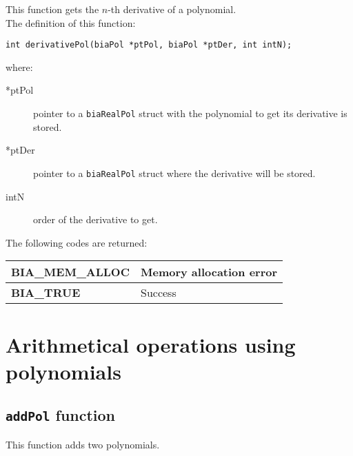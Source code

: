This function gets the $n$-th derivative of a polynomial.\\

The definition of this function:
%
\begin{verbatim}
int derivativePol(biaPol *ptPol, biaPol *ptDer, int intN);
\end{verbatim}
%
where:
\begin{description} 
\item[*ptPol] pointer to a \texttt{biaRealPol} struct with the polynomial to get its derivative is stored.
\item[*ptDer] pointer to a \texttt{biaRealPol} struct where the derivative will be stored.
\item[intN] order of the derivative to get.
\end{description}
%
The following codes are returned:
%
\begin{center}
\begin{tabular}{|l|l|}
\hline
\textbf{BIA\_MEM\_ALLOC} & Memory allocation error \\
\hline
\textbf{BIA\_TRUE} & Success \\
\hline
\end{tabular}
\end{center}
%
%

\section{Arithmetical operations using polynomials}

\subsection{\texttt{addPol} function}

This function adds two polynomials.\\

